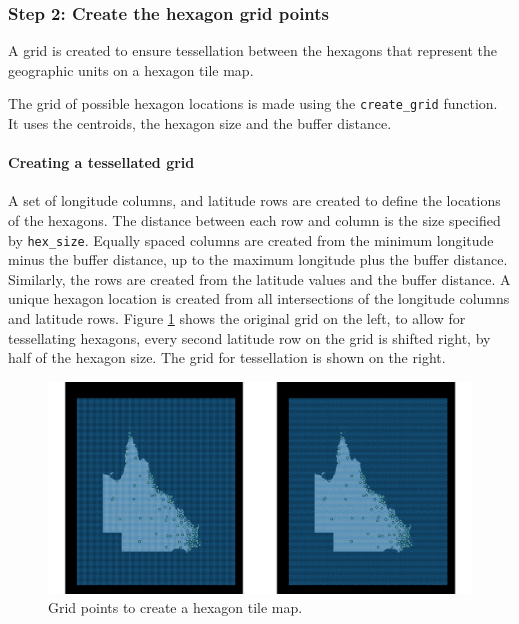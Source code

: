 \documentclass{monashthesis}
\begin{document}
\hypertarget{step-2-create-the-hexagon-grid-points}{%
\subsubsection{Step 2: Create the hexagon grid points}\label{step-2-create-the-hexagon-grid-points}}

A grid is created to ensure tessellation between the hexagons that represent the geographic units on a hexagon tile map.

The grid of possible hexagon locations is made using the \texttt{create\_grid} function.
It uses the centroids, the hexagon size and the buffer distance.

\hypertarget{creating-a-tessellated-grid}{%
\paragraph{Creating a tessellated grid}\label{creating-a-tessellated-grid}}

A set of longitude columns, and latitude rows are created to define the locations of the hexagons. The distance between each row and column is the size specified by \texttt{hex\_size}.
Equally spaced columns are created from the minimum longitude minus the buffer distance, up to the maximum longitude plus the buffer distance. Similarly, the rows are created from the latitude values and the buffer distance.
A unique hexagon location is created from all intersections of the longitude columns and latitude rows.
Figure \ref{fig:grid2} shows the original grid on the left, to allow for tessellating hexagons, every second latitude row on the grid is shifted right, by half of the hexagon size. The grid for tessellation is shown on the right.

\begin{figure}[H]
\centering
\includegraphics[width=16cm]{figures/03-algorithm/2grid.pdf}
\caption{\label{fig:grid2}Grid points to create a hexagon tile map.}
\end{figure}
\end{document}
